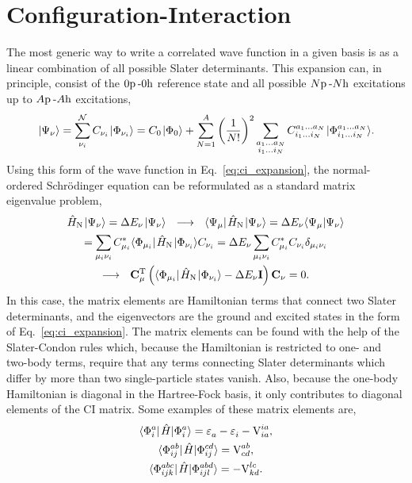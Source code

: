 \documentclass[thesis.tex]{subfiles}
\begin{document}
\section{Configuration-Interaction} \label{section:configuration_interaction}
The most generic way to write a correlated wave function in a given basis is as a linear combination of all possible Slater determinants.  This expansion can, in principle, consist of the $0\mathrm{p}\hspace{2pt}\text{-}0\mathrm{h}$ reference state and all possible $N\mathrm{p}\hspace{2pt}\text{-}N\mathrm{h}$ excitations up to $A\mathrm{p}\hspace{2pt}\text{-}A\mathrm{h}$ excitations,
\begin{equation} \label{eq:ci_expansion}
  \hspace{1pt}\lvert \Psi_{\nu} \rangle = \sum_{\nu_{i}}^{\mathcal{N}}C_{\nu_{i}}\hspace{1pt}\lvert \Phi_{\nu_{i}} \rangle = C_{0}\hspace{1pt}\lvert \Phi_{0} \rangle + \sum_{N=1}^{A}\left(\frac{1}{N!}\right)^2 \sum_{\substack{a_{1} \ldots a_{N} \\ i_{1} \ldots i_{N}}} C^{a_{1} \ldots a_{N}}_{i_{1} \ldots i_{N}}\hspace{1pt}\lvert \Phi^{a_{1} \ldots a_{N}}_{i_{1} \ldots i_{N}} \rangle.
\end{equation}
Using this form of the wave function in Eq.\ \eqref{eq:ci_expansion}, the normal-ordered Schr\"{o}dinger equation can be reformulated as a standard matrix eigenvalue problem,
\begin{gather}
  \HamN\ket{\Psi_{\nu}} = \Ecorr_{\nu}\ket{\Psi_{\nu}}\ \ \longrightarrow\ \ \element{\Psi_{\mu}}{\HamN}{\Psi_{\nu}} = \Ecorr_{\nu}\braket{\Psi_{\mu}}{\Psi_{\nu}} \notag \\
  = \sum_{\mathclap{\mu_{i}\nu_{i}}}C^{*}_{\mu_{i}}\element{\Phi_{\mu_{i}}}{\HamN}{\Phi_{\nu_{i}}}C_{\nu_{i}} = \Ecorr_{\nu}\sum_{\mathclap{\mu_{i}\nu_{i}}}C^{*}_{\mu_{i}}C_{\nu_{i}}\delta_{\mu_{i}\nu_{i}} \notag \\
  \longrightarrow\ \ \mathbf{C}^{\text{T}}_{\mu}\left(\element{\Phi_{\mu_{i}}}{\HamN}{\Phi_{\nu_{i}}} - \Ecorr_{\nu}\mathbf{I}\right)\mathbf{C}_{\nu} = 0.
\end{gather}
In this case, the matrix elements are Hamiltonian terms that connect two Slater determinants, and the eigenvectors are the ground and excited states in the form of Eq.\ \eqref{eq:ci_expansion}.  The matrix elements can be found with the help of the Slater-Condon rules \cite{SLATER1929,CONDON1930} which, because the Hamiltonian is restricted to one- and two-body terms, require that any terms connecting Slater determinants which differ by more than two single-particle states vanish.  Also, because the one-body Hamiltonian is diagonal in the Hartree-Fock basis, it only contributes to diagonal elements of the CI matrix.  Some examples of these matrix elements are,
\begin{gather} \label{eq:slater_condon}
  \element{\Phi^{a}_{i}}{\Ham}{\Phi^{a}_{i}} = \Edenom{}{a} - \Edenom{}{i} - \vint{ia}{ia}, \notag \\
  \element{\Phi^{ab}_{ij}}{\Ham}{\Phi^{cd}_{ij}} = \vint{ab}{cd}, \notag \\
  \element{\Phi^{abc}_{ijk}}{\Ham}{\Phi^{abd}_{ijl}} = -\vint{lc}{kd}.
\end{gather}
\end{document}
